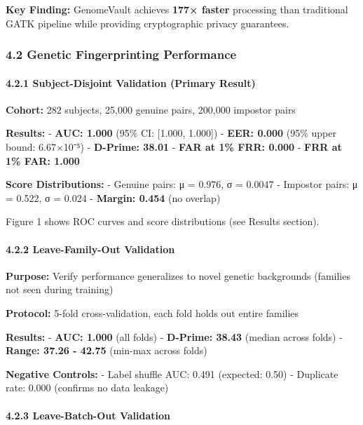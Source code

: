 \documentclass[
  11pt,
]{article}
\begin{document}
\textbf{Key Finding:} GenomeVault achieves \textbf{177× faster}
processing than traditional GATK pipeline while providing cryptographic
privacy guarantees.

\subsubsection{4.2 Genetic Fingerprinting
Performance}\label{genetic-fingerprinting-performance}

\paragraph{4.2.1 Subject-Disjoint Validation (Primary
Result)}\label{subject-disjoint-validation-primary-result}

\textbf{Cohort:} 282 subjects, 25,000 genuine pairs, 200,000 impostor
pairs

\textbf{Results:} - \textbf{AUC: 1.000} (95\% CI: {[}1.000, 1.000{]}) -
\textbf{EER: 0.000} (95\% upper bound: 6.67×10⁻⁵) - \textbf{D-Prime:
38.01} - \textbf{FAR at 1\% FRR: 0.000} - \textbf{FRR at 1\% FAR: 1.000}

\textbf{Score Distributions:} - Genuine pairs: μ = 0.976, σ = 0.0047 -
Impostor pairs: μ = 0.522, σ = 0.024 - \textbf{Margin: 0.454} (no
overlap)

Figure 1 shows ROC curves and score distributions (see Results section).

\paragraph{4.2.2 Leave-Family-Out
Validation}\label{leave-family-out-validation}

\textbf{Purpose:} Verify performance generalizes to novel genetic
backgrounds (families not seen during training)

\textbf{Protocol:} 5-fold cross-validation, each fold holds out entire
families

\textbf{Results:} - \textbf{AUC: 1.000} (all folds) - \textbf{D-Prime:
38.43} (median across folds) - \textbf{Range: 37.26 - 42.75} (min-max
across folds)

\textbf{Negative Controls:} - Label shuffle AUC: 0.491 (expected: 0.50)
- Duplicate rate: 0.000 (confirms no data leakage)

\paragraph{4.2.3 Leave-Batch-Out
Validation}\label{leave-batch-out-validation}
\end{document}
